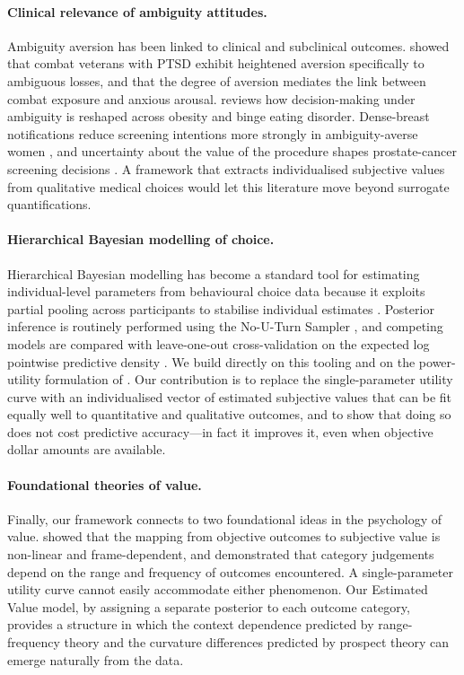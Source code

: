 \paragraph{Clinical relevance of ambiguity attitudes.}
Ambiguity aversion has been linked to clinical and subclinical outcomes. \citet{ruderman2016ptsd} showed that combat veterans with PTSD exhibit heightened aversion specifically to ambiguous losses, and that the degree of aversion mediates the link between combat exposure and anxious arousal. \citet{voon2015bed} reviews how decision-making under ambiguity is reshaped across obesity and binge eating disorder. Dense-breast notifications reduce screening intentions more strongly in ambiguity-averse women \citep{yeh2015dense}, and uncertainty about the value of the procedure shapes prostate-cancer screening decisions \citep{james2017prostate}. A framework that extracts individualised subjective values from qualitative medical choices would let this literature move beyond surrogate quantifications.

\paragraph{Hierarchical Bayesian modelling of choice.}
Hierarchical Bayesian modelling has become a standard tool for estimating individual-level parameters from behavioural choice data because it exploits partial pooling across participants to stabilise individual estimates \citep{salvatier2016pymc3,kumar2019arviz}. Posterior inference is routinely performed using the No-U-Turn Sampler \citep{hoffman2014nuts}, and competing models are compared with leave-one-out cross-validation on the expected log pointwise predictive density \citep{vehtari2017loo}. We build directly on this tooling and on the power-utility formulation of \citet{levy2012measuring}. Our contribution is to replace the single-parameter utility curve with an individualised vector of estimated subjective values that can be fit equally well to quantitative and qualitative outcomes, and to show that doing so does not cost predictive accuracy---in fact it improves it, even when objective dollar amounts are available.

\paragraph{Foundational theories of value.}
Finally, our framework connects to two foundational ideas in the psychology of value. \citet{kahneman1979prospect} showed that the mapping from objective outcomes to subjective value is non-linear and frame-dependent, and \citet{parducci1965range} demonstrated that category judgements depend on the range and frequency of outcomes encountered. A single-parameter utility curve cannot easily accommodate either phenomenon. Our Estimated Value model, by assigning a separate posterior to each outcome category, provides a structure in which the context dependence predicted by range-frequency theory and the curvature differences predicted by prospect theory can emerge naturally from the data.
